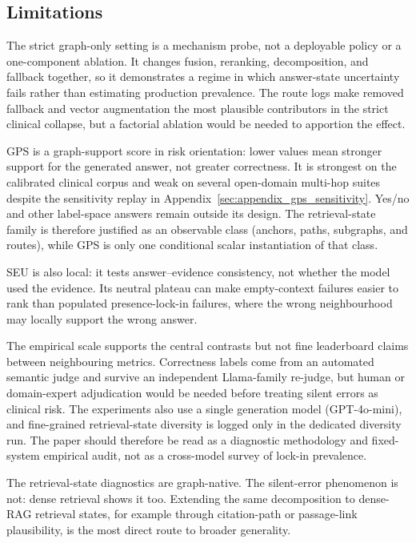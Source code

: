 \subsection{Limitations}
\label{sec:limitations}

The strict graph-only setting is a mechanism probe, not a deployable policy or
a one-component ablation. It changes fusion, reranking, decomposition, and
fallback together, so it demonstrates a regime in which answer-state uncertainty
fails rather than estimating production prevalence. The route logs make removed
fallback and vector augmentation the most plausible contributors in the strict
clinical collapse, but a factorial ablation would be needed to apportion the
effect.

GPS is a graph-support score in risk orientation: lower values mean stronger
support for the generated answer, not greater correctness. It is strongest on
the calibrated clinical corpus and weak on several open-domain multi-hop suites
despite the sensitivity replay in Appendix~\ref{sec:appendix_gps_sensitivity}.
Yes/no and other label-space answers remain outside its design.
The retrieval-state family is therefore justified as an observable class
(anchors, paths, subgraphs, and routes), while GPS is only one conditional scalar
instantiation of that class.

SEU is also local: it tests answer--evidence consistency, not whether the model
used the evidence. Its neutral plateau can make empty-context failures easier to
rank than populated presence-lock-in failures, where the wrong neighbourhood may
locally support the wrong answer.

The empirical scale supports the central contrasts but not fine leaderboard
claims between neighbouring metrics. Correctness labels come from an automated
semantic judge and survive an independent Llama-family re-judge, but human or
domain-expert adjudication would be needed before treating silent errors as
clinical risk. The experiments also use a single generation model
(GPT-4o-mini), and fine-grained retrieval-state diversity is logged only in the
dedicated diversity run.
The paper should therefore be read as a diagnostic methodology and fixed-system
empirical audit, not as a cross-model survey of lock-in prevalence.

The retrieval-state diagnostics are graph-native. The silent-error phenomenon
is not: dense retrieval shows it too. Extending the same decomposition to
dense-RAG retrieval states, for example through citation-path or passage-link
plausibility, is the most direct route to broader generality.

